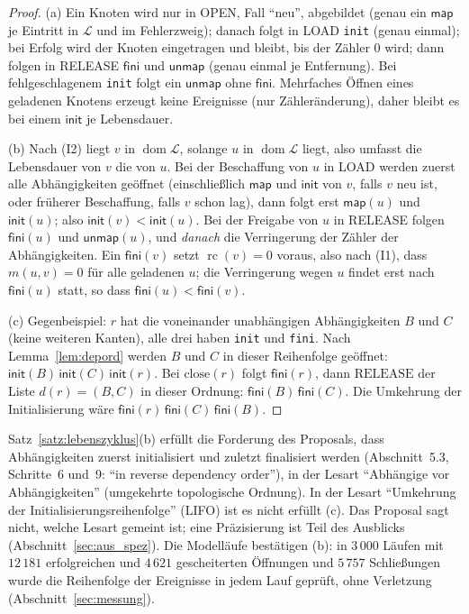\documentclass[a4paper,12pt,twoside]{report}
\DeclareRobustCommand{\_}{\ifmmode\mbox{\textunderscore}\else\textunderscore\allowbreak{}\fi}
\theoremstyle{definition}
\newcommand{\dom}{\operatorname{dom}}
\newcommand{\rc}{\operatorname{rc}}
\begin{document}
\begin{proof}
	(a) Ein Knoten wird nur in OPEN, Fall ``neu'', abgebildet (genau ein $\mathsf{map}$ je Eintritt in $\mathcal L$ und im Fehlerzweig); danach folgt in LOAD \texttt{init} (genau einmal); bei Erfolg wird der Knoten eingetragen und bleibt, bis der Zähler $0$ wird; dann folgen in RELEASE $\mathsf{fini}$ und $\mathsf{unmap}$ (genau einmal je Entfernung). Bei fehlgeschlagenem \texttt{init} folgt ein $\mathsf{unmap}$ ohne $\mathsf{fini}$. Mehrfaches Öffnen eines geladenen Knotens erzeugt keine Ereignisse (nur Zähleränderung), daher bleibt es bei einem $\mathsf{init}$ je Lebensdauer.

	(b) Nach (I2) liegt $v$ in $\dom\mathcal L$, solange $u$ in $\dom\mathcal L$ liegt, also umfasst die Lebensdauer von $v$ die von $u$. Bei der Beschaffung von $u$ in LOAD werden zuerst alle Abhängigkeiten geöffnet (einschließlich $\mathsf{map}$ und $\mathsf{init}$ von $v$, falls $v$ neu ist, oder früherer Beschaffung, falls $v$ schon lag), dann folgt erst $\mathsf{map}(u)$ und $\mathsf{init}(u)$; also $\mathsf{init}(v)<\mathsf{init}(u)$. Bei der Freigabe von $u$ in RELEASE folgen $\mathsf{fini}(u)$ und $\mathsf{unmap}(u)$, und \emph{danach} die Verringerung der Zähler der Abhängigkeiten. Ein $\mathsf{fini}(v)$ setzt $\rc(v)=0$ voraus, also nach (I1), dass $m(u,v)=0$ für alle geladenen $u$; die Verringerung wegen $u$ findet erst nach $\mathsf{fini}(u)$ statt, so dass $\mathsf{fini}(u)<\mathsf{fini}(v)$.

	(c) Gegenbeispiel: $r$ hat die voneinander unabhängigen Abhängigkeiten $B$ und $C$ (keine weiteren Kanten), alle drei haben \texttt{init} und \texttt{fini}. Nach Lemma~\ref{lem:depord} werden $B$ und $C$ in dieser Reihenfolge geöffnet: $\mathsf{init}(B)\,\mathsf{init}(C)\,\mathsf{init}(r)$. Bei $\mathrm{close}(r)$ folgt $\mathsf{fini}(r)$, dann $\mathrm{RELEASE}$ der Liste $d(r)=(B,C)$ in dieser Ordnung: $\mathsf{fini}(B)\,\mathsf{fini}(C)$. Die Umkehrung der Initialisierung wäre $\mathsf{fini}(r)\,\mathsf{fini}(C)\,\mathsf{fini}(B)$.
\end{proof}

Satz~\ref{satz:lebenszyklus}(b) erfüllt die Forderung des Proposals, dass Abhängigkeiten zuerst initialisiert und zuletzt finalisiert werden (Abschnitt~5.3, Schritte~6 und~9: ``in reverse dependency order''), in der Lesart ``Abhängige vor Abhängigkeiten'' (umgekehrte topologische Ordnung). In der Lesart ``Umkehrung der Initialisierungsreihenfolge'' (LIFO) ist es nicht erfüllt (c). Das Proposal sagt nicht, welche Lesart gemeint ist; eine Präzisierung ist Teil des Ausblicks (Abschnitt~\ref{sec:aus_spez}). Die Modelläufe bestätigen (b): in $3\,000$ Läufen mit $12\,181$ erfolgreichen und $4\,621$ gescheiterten Öffnungen und $5\,757$ Schließungen wurde die Reihenfolge der Ereignisse in jedem Lauf geprüft, ohne Verletzung (Abschnitt~\ref{sec:messung}).
\end{document}
